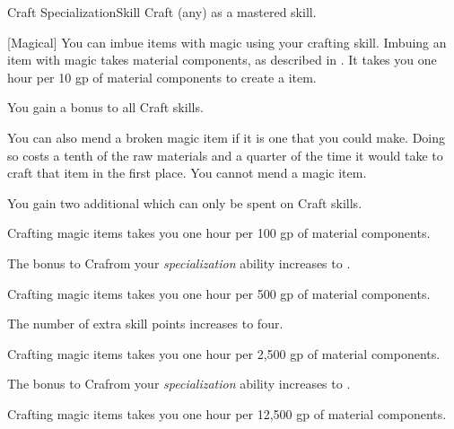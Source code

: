     \begin{feat}{Craft Specialization}{Skill}
        \featpre Craft (any) as a mastered skill.

        [Magical] You can imbue items with magic using your crafting skill.
        Imbuing an item with magic takes material components, as described in .
        It takes you one hour per 10 gp of material components to create a item.

         You gain a  bonus to all Craft skills.

        You can also mend a broken magic item if it is one that you could make.
        Doing so costs a tenth of the raw materials and a quarter of the time it would take to craft that item in the first place.
        You cannot mend a  magic item.

         You gain two additional  which can only be spent on Craft skills.

         Crafting magic items takes you one hour per 100 gp of material components.

         The bonus to Crafrom your \textit{specialization} ability increases to .

         Crafting magic items takes you one hour per 500 gp of material components.

         The number of extra skill points increases to four.

         Crafting magic items takes you one hour per 2,500 gp of material components.

         The bonus to Crafrom your \textit{specialization} ability increases to .

         Crafting magic items takes you one hour per 12,500 gp of material components.
    \end{feat}

